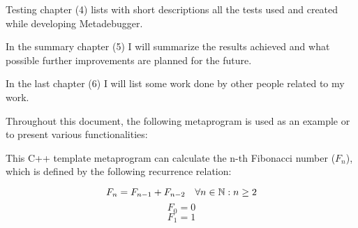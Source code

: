 Testing chapter (4) lists with short descriptions all the tests used and
created while developing Metadebugger.

In the summary chapter (5) I will summarize the results achieved and what
possible further improvements are planned for the future.

In the last chapter (6) I will list some work done by other people related to
my work.

Throughout this document, the following metaprogram is used as an example or to
present various functionalities:


This C++ template metaprogram can calculate the n-th Fibonacci number
(\(F_n\)), which is defined by the following recurrence relation:

\[
    F_n = F_{n-1} + F_{n-2} \quad \forall n \in \mathbb{N}: n \geq 2 \\
\]
\[
    F_0 = 0
\]
\[
    F_1 = 1
\]

